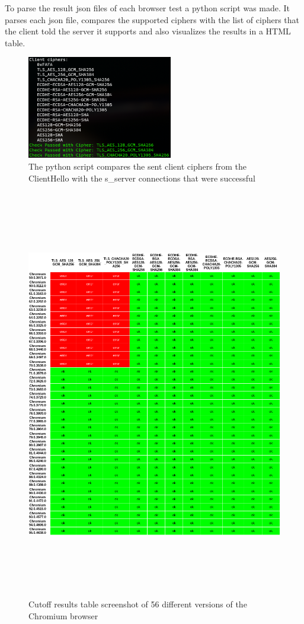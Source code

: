 \documentclass[12pt]{scrbook}
\begin{document}
To parse the result json files of each browser test a python script was made. It parses each json file, compares the supported ciphers
with the list of ciphers that the client told the server it supports and also visualizes the results in a HTML table.  

\begin{figure}[!hb]
  \centering
  \includegraphics[height=45mm]{./images/parse_results.png}
  \caption{The python script compares the sent client ciphers from the ClientHello with the s\_server connections that were successful}
\end{figure}

\begin{figure}[!h]
  \centering
  \includegraphics[height=18cm]{./images/cipher_checker_table.png}
  \caption{Cutoff results table screenshot of 56 different versions of the Chromium browser}
\end{figure}
\end{document}
